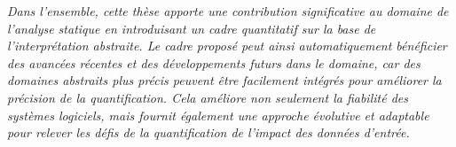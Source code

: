 \emph{Dans l'ensemble, cette thèse apporte une contribution significative au domaine de l'analyse statique en introduisant un cadre quantitatif sur la base de l'interprétation abstraite. Le cadre proposé peut ainsi automatiquement bénéficier des avancées récentes et des développements futurs dans le domaine, car des domaines abstraits plus précis peuvent être facilement intégrés pour améliorer la précision de la quantification. Cela améliore non seulement la fiabilité des systèmes logiciels, mais fournit également une approche évolutive et adaptable pour relever les défis de la quantification de l'impact des données d'entrée.}

